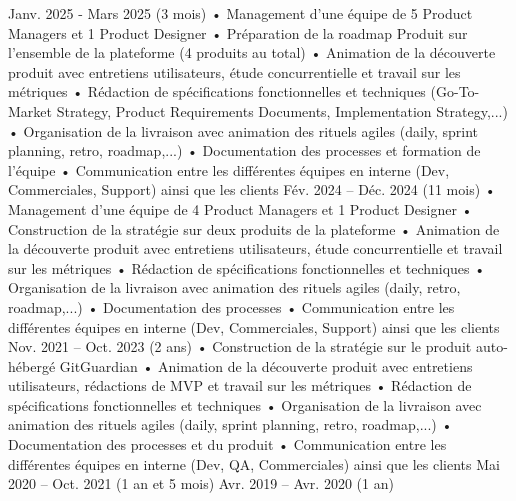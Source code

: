\documentclass[
	a4paper,
	maincolor=re,
	sidecolor=bg-2,
	sidetextcolor=tex-3,
	sectioncolor=re,
	subsectioncolor=tex-2,
	itemtextcolor=tex-3,
	profilepicsize=3.5cm,
	profilepicborderwidth=2pt,
	datecolwidth=0pt,
]{fortysecondscv}
\begin{document}
\begin{cvtable}
	{Janv. 2025 - Mars 2025 (3 mois)}{
		• Management d’une équipe de 5 Product Managers et 1 Product 
		Designer\newline
	 	• Préparation de la roadmap Produit sur l’ensemble de la plateforme
	 	(4 produits au total)\newline
	 	• Animation de la découverte produit avec entretiens utilisateurs, 
	 	étude concurrentielle et travail sur les métriques\newline
	 	• Rédaction de spécifications fonctionnelles et techniques (Go-To-Market 
		Strategy, Product Requirements Documents, Implementation 
		Strategy,...)\newline
	 	• Organisation de la livraison avec animation des rituels agiles (daily, 
		sprint planning, retro, roadmap,...)\newline
	 	• Documentation des processes et formation de l’équipe\newline
	 	• Communication entre les différentes équipes en interne (Dev, 
		Commerciales, Support) ainsi que les clients\newline
	}
	{Fév. 2024 -- Déc. 2024 (11 mois)}{
		• Management d’une équipe de 4 Product Managers et 1 Product Designer\newline
		• Construction de la stratégie sur deux produits de la plateforme\newline
		• Animation de la découverte produit avec entretiens utilisateurs, étude concurrentielle et travail sur les métriques\newline
		• Rédaction de spécifications fonctionnelles et techniques\newline
		• Organisation de la livraison avec animation des rituels agiles (daily, retro, roadmap,...)\newline
		• Documentation des processes\newline
		• Communication entre les différentes équipes en interne (Dev, Commerciales, Support) ainsi que les clients\newline
	}
	{Nov. 2021 -- Oct. 2023 (2 ans)}{
		• Construction de la stratégie sur le produit auto-hébergé 
		GitGuardian\newline
		• Animation de la découverte produit avec entretiens utilisateurs,
		rédactions de MVP et travail sur les métriques\newline
		• Rédaction de spécifications fonctionnelles et techniques\newline
		• Organisation de la livraison avec animation des rituels agiles
		(daily, sprint planning, retro, roadmap,...)\newline
		• Documentation des processes et du produit\newline
		• Communication entre les différentes équipes en interne (Dev, QA, Commerciales) ainsi que les clients\newline
	}
	{Mai 2020 -- Oct. 2021 (1 an et 5 mois)}{ }
	{Avr. 2019 -- Avr. 2020 (1 an)}{ }
\end{cvtable}
\end{document}
